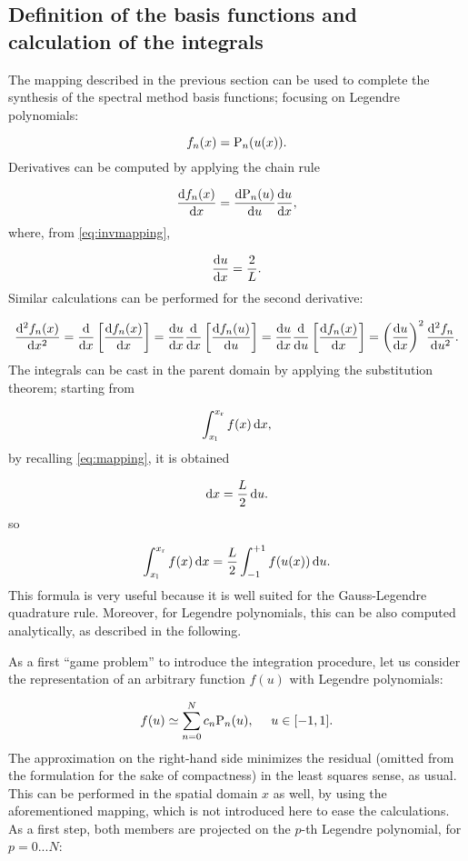 \documentclass[a4paper,12pt]{article}
\begin{document}



\subsection{Definition of the basis functions and calculation of the integrals}

The mapping described in the previous section can be used to complete the synthesis of the spectral method basis functions; focusing on Legendre polynomials:

\begin{equation}
f_n(x) = \mathrm{P}_n(u(x)).
\label{eq:smbasisfunctions}
\end{equation}
Derivatives can be computed by applying the chain rule

\[
\frac{\mathrm{d} f_n(x)}{\mathrm{d} x} = \frac{\mathrm{d} \mathrm{P}_n(u)}{\mathrm{d} u} \frac{\mathrm{d} u}{\mathrm{d} x},
\]
where, from \eqref{eq:invmapping},

\[
\frac{\mathrm{d} u}{\mathrm{d} x} = \frac{2}{L}.
\]
Similar calculations can be performed for the second derivative:

\[
\frac{\mathrm{d}^2 f_n(x)}{\mathrm{d} x^2} = \frac{\mathrm{d}}{\mathrm{d} x} \left[ \frac{\mathrm{d} f_n(x)}{\mathrm{d} x} \right] = \frac{\mathrm{d} u}{\mathrm{d} x} \frac{\mathrm{d}}{\mathrm{d} x} \left[ \frac{\mathrm{d} f_n(u)}{\mathrm{d} u} \right] = \frac{\mathrm{d} u}{\mathrm{d} x} \frac{\mathrm{d} }{\mathrm{d} u} \left[ \frac{\mathrm{d} f_n(x)}{\mathrm{d} x} \right] = \left( \frac{\mathrm{d} u}{\mathrm{d} x} \right)^2 \frac{\mathrm{d}^2 f_n}{\mathrm{d} u^2}.
\]
The integrals can be cast in the parent domain by applying the substitution theorem; starting from

\[
\int_{x_{\mathrm{l}}}^{x_{\mathrm{r}}} f(x) \, \mathrm{d} x,
\]
by recalling \eqref{eq:mapping}, it is obtained

\[
\mathrm{d} x = \frac{L}{2} \, \mathrm{d} u.
\]
so

\[
\int_{x_{\mathrm{l}}}^{x_{\mathrm{r}}} f(x) \, \mathrm{d} x = \frac{L}{2} \int_{-1}^{+1} f(u(x)) \, \mathrm{d} u.
\]
This formula is very useful because it is well suited for the Gauss-Legendre quadrature rule. Moreover, for Legendre polynomials, this can be also computed analytically, as described in the following.

As a first ``game problem'' to introduce the integration procedure, let us consider the representation of an arbitrary function $f(u)$ with Legendre polynomials:

\[
f(u) \simeq \sum_{n=0}^{N} c_n \mathrm{P}_n(u), ~~~~ u \in [-1,1].
\]
The approximation on the right-hand side minimizes the residual (omitted from the formulation for the sake of compactness) in the least squares sense, as usual. This can be performed in the spatial domain $x$ as well, by using the aforementioned mapping, which is not introduced here to ease the calculations. As a first step, both members are projected on the $p$-th Legendre polynomial, for $p=0...N$:
\end{document}

